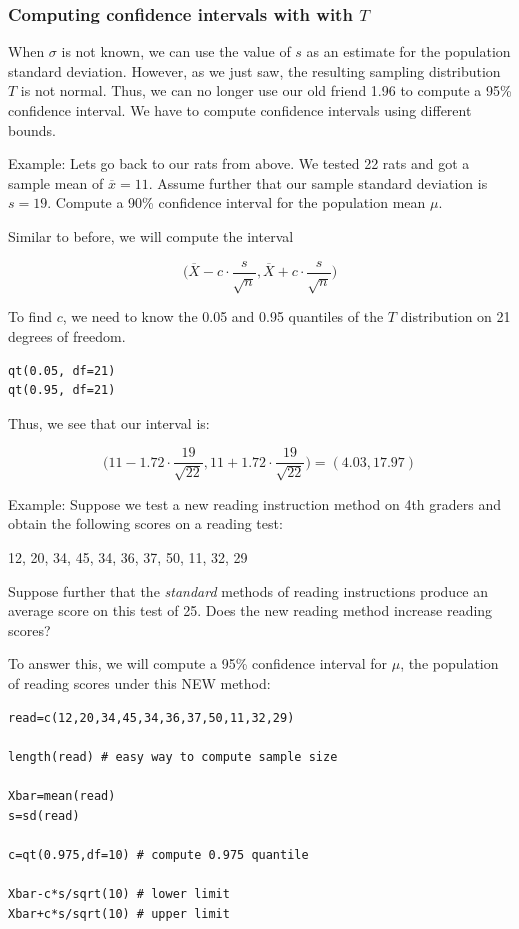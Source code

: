 \documentclass[11pt]{article}
\begin{document}
\subsubsection*{Computing confidence intervals with with $T$}
\label{sec-2-2-2}

When $\sigma$ is not known, we can use the value of $s$ as an estimate for the population standard deviation. However, as we just saw, the resulting sampling distribution $T$ is not normal.  Thus, we can no longer use our old friend 1.96 to compute a 95\% confidence interval.  We have to compute confidence intervals using different bounds.

Example:  Lets go back to our rats from above.  We tested 22 rats and got a sample mean of $\overline{x}=11$.  Assume further that our sample standard deviation is $s=19$.  Compute a 90\% confidence interval for the population mean $\mu$.

Similar to before, we will compute the interval

\[
\Biggl(\overline{X}-c\cdot \frac{s}{\sqrt{n}}, \overline{X}+c\cdot \frac{s}{\sqrt{n}}\Biggr)
\]

To find $c$, we need to know the 0.05 and 0.95 quantiles of the $T$ distribution on 21 degrees of freedom.

\begin{verbatim}
qt(0.05, df=21)
qt(0.95, df=21)
\end{verbatim}

Thus, we see that our interval is:

\[
\Biggl(11-1.72\cdot \frac{19}{\sqrt{22}}, 11+1.72\cdot \frac{19}{\sqrt{22}}\Biggr) = (4.03, 17.97)
\]

Example:  Suppose we test a new reading instruction method on 4th graders and obtain the following scores on a reading test: 

12, 20, 34, 45, 34, 36, 37, 50, 11, 32, 29

Suppose further that the \emph{standard} methods of reading instructions produce an average score on this test of 25.  Does the new reading method increase reading scores?

To answer this, we will compute a 95\% confidence interval for $\mu$, the population of reading scores under this NEW method:

\begin{verbatim}
read=c(12,20,34,45,34,36,37,50,11,32,29)

length(read) # easy way to compute sample size

Xbar=mean(read)
s=sd(read)

c=qt(0.975,df=10) # compute 0.975 quantile

Xbar-c*s/sqrt(10) # lower limit
Xbar+c*s/sqrt(10) # upper limit
\end{verbatim}
\end{document}
